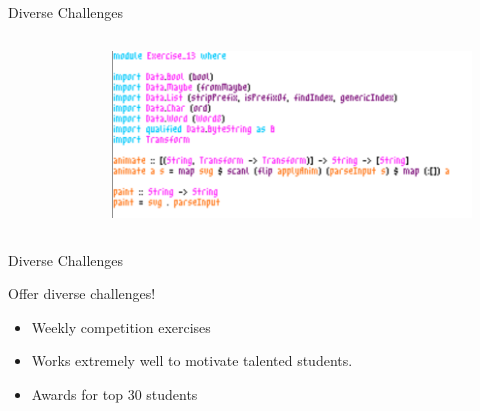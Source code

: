 \documentclass[aspectratio=169]{beamer}
\begin{document}
\begin{frame}[fragile]{Diverse Challenges}
{\begin{columns}[t]
\begin{column}{0.35\textwidth}
\begin{figure}
\end{figure}
\end{column}
\begin{column}{0.65\textwidth}
\begin{figure}
\includegraphics[width=\textwidth]{assets/creativity2}
\end{figure}
\end{column}
\end{columns}
}
\end{frame}

\begin{frame}[fragile]{Diverse Challenges}
\centerline{\Large{\alert{Offer diverse challenges!}}}
\begin{itemize}
\item Weekly competition exercises
\item Works extremely well to motivate talented students.
\item<2-> Awards for top 30 students
\end{itemize}
\end{frame}
\end{document}
